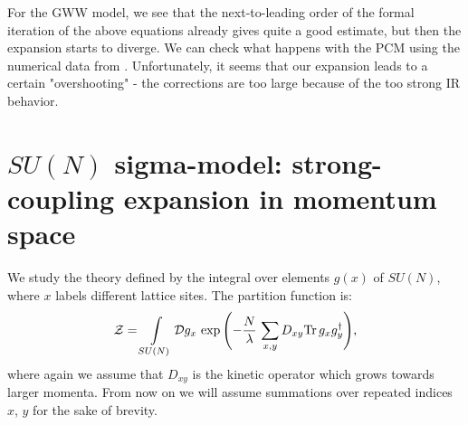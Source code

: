 \documentclass[twocolumn,showpacs,preprintnumbers,superscriptaddress,amsmath,floatfix,amssymb,secnumarabic]{revtex4}
\newcommand{\lr}[1]{ \left( #1 \right) }
\newcommand{\tr}{ {\rm Tr} \, }
\newcommand{\expa}[1]{ \exp{\left( #1 \right)} }
\begin{document}
 For the GWW model, we see that the next-to-leading order of the formal iteration of the above equations already gives quite a good estimate, but then the expansion starts to diverge. We can check what happens with the PCM using the numerical data from \cite{Rossi:94:1}. Unfortunately, it seems that our expansion leads to a certain "overshooting" - the corrections are too large because of the too strong IR behavior.

\section*{$SU\lr{N}$ sigma-model: strong-coupling expansion in momentum space}
\label{sec:introduction}

 We study the theory defined by the integral over elements $g\lr{x}$ of $SU\lr{N}$, where $x$ labels different lattice sites. The partition function is:
\begin{eqnarray}
\label{pf_def}
\mathcal{Z} = \int\limits_{SU\lr{N}} \mathcal{D} g_x \,
\expa{-\frac{N}{\lambda}\, \sum \limits_{x,y} D_{xy} \tr g_x g^{\dag}_y } ,
\end{eqnarray}
where again we assume that $D_{xy}$ is the kinetic operator which grows towards larger momenta. From now on we will assume summations over repeated indices $x$, $y$ for the sake of brevity.
\end{document}
